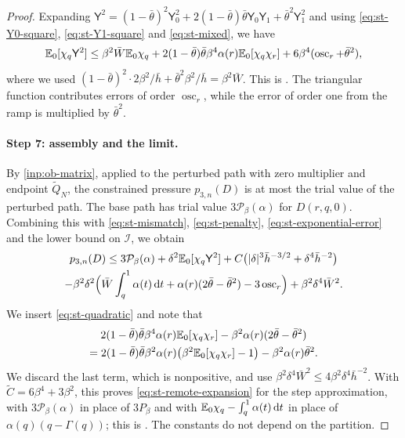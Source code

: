 \begin{proof}
Expanding $\mathsf Y^2=(1-\bar\theta)^2\mathsf Y_0^2+2(1-\bar\theta)\bar\theta\mathsf Y_0\mathsf Y_1+\bar\theta^2\mathsf Y_1^2$ and using \eqref{eq:st-Y0-square}, \eqref{eq:st-Y1-square} and \eqref{eq:st-mixed}, we have
\begin{equation}\label{eq:st-quadratic}
 \mathbb E_0[\chi_q\mathsf Y^2]\le\beta^2\bar W\mathbb E_0\chi_q+2(1-\bar\theta)\bar\theta\beta^4\alpha(r)\mathbb E_0[\chi_q\chi_r]+6\beta^4(\operatorname{osc}_r+\bar\theta^2),
\end{equation}
where we used $(1-\bar\theta)^2\cdot2\beta^2/\bar h+\bar\theta^2\beta^2/\bar h=\beta^2\bar W$. This is \cite[(7.20)]{oai-barriers}. The triangular function contributes errors of order $\operatorname{osc}_r$, while the error of order one from the ramp is multiplied by $\bar\theta^2$.

\paragraph{Step 7: assembly and the limit.} By \cref{inp:ob-matrix}, applied to the perturbed path with zero multiplier and endpoint $\widetilde Q_N$, the constrained pressure $p_{3,n}(D)$ is at most the trial value of the perturbed path. The base path has trial value $3\mathcal P_\beta(\alpha)$ for $D(r,q,0)$. Combining this with \eqref{eq:st-mismatch}, \eqref{eq:st-penalty}, \eqref{eq:st-exponential-error} and the lower bound on $\mathcal I$, we obtain
\begin{multline*}
 p_{3,n}(D)\le3\mathcal P_\beta(\alpha)+\delta^2\mathbb E_0[\chi_q\mathsf Y^2]+C\bigl(\lvert \delta\rvert^3\bar h^{-3/2}+\delta^4\bar h^{-2}\bigr)\\
 -\beta^2\delta^2\Bigl(\bar W\int_q^1\alpha(t)\,\mathrm d t+\alpha(r)(2\bar\theta-\bar\theta^2)-3\operatorname{osc}_r\Bigr)+\beta^2\delta^4\bar W^2.
\end{multline*}
We insert \eqref{eq:st-quadratic} and note that
\begin{multline*}
 2(1-\bar\theta)\bar\theta\beta^4\alpha(r)\mathbb E_0[\chi_q\chi_r]-\beta^2\alpha(r)(2\bar\theta-\bar\theta^2)\\
 =2(1-\bar\theta)\bar\theta\beta^2\alpha(r)\bigl(\beta^2\mathbb E_0[\chi_q\chi_r]-1\bigr)-\beta^2\alpha(r)\bar\theta^2.
\end{multline*}
We discard the last term, which is nonpositive, and use $\beta^2\delta^4\bar W^2\le4\beta^2\delta^4\bar h^{-2}$. With $\widetilde C=6\beta^4+3\beta^2$, this proves \eqref{eq:st-remote-expansion} for the step approximation, with $3\mathcal P_\beta(\alpha)$ in place of $3P_\beta$ and with $\mathbb E_0\chi_q-\int_q^1\alpha(t)\,\mathrm d t$ in place of $\alpha(q)(q-\Gamma(q))$; this is \cite[(7.29)]{oai-barriers}. The constants do not depend on the partition.


\end{proof}

